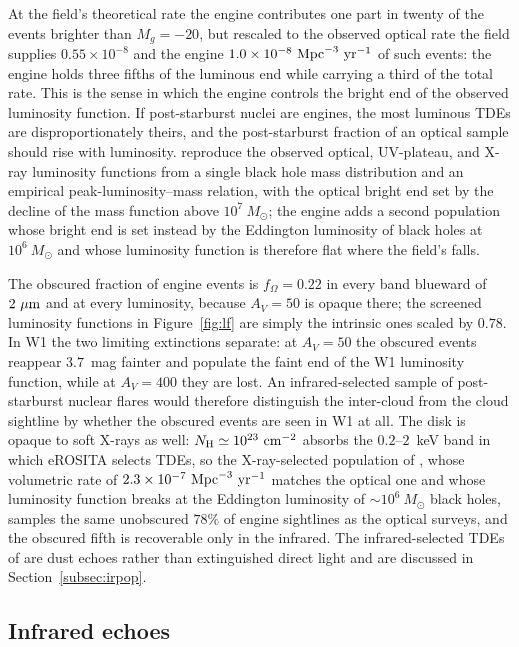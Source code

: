 \documentclass[twocolumn,pdftex]{aastex701}
\newcommand{\msun}{M_{\odot}\xspace}
\newcommand{\fom}{f_{\Omega}\xspace}
\newcommand{\um}{\mu{\rm m}\xspace}
\begin{document}
At the field's theoretical rate the engine contributes one part in twenty of the events brighter than $M_g = -20$, but rescaled to the observed optical rate the field supplies $0.55 \times 10^{-8}$ and the engine $1.0 \times 10^{-8}~{\rm Mpc}^{-3}~{\rm yr}^{-1}$ of such events: the engine holds three fifths of the luminous end while carrying a third of the total rate. This is the sense in which the engine controls the bright end of the observed luminosity function. If post-starburst nuclei are engines, the most luminous TDEs are disproportionately theirs, and the post-starburst fraction of an optical sample should rise with luminosity. \citet{Mummery:2025a} reproduce the observed optical, UV-plateau, and X-ray luminosity functions from a single black hole mass distribution and an empirical peak-luminosity--mass relation, with the optical bright end set by the decline of the mass function above $10^{7}~\msun$; the engine adds a second population whose bright end is set instead by the Eddington luminosity of black holes at $10^{6}~\msun$ and whose luminosity function is therefore flat where the field's falls.

The obscured fraction of engine events is $\fom = 0.22$ in every band blueward of $2~\um$ and at every luminosity, because $A_V = 50$ is opaque there; the screened luminosity functions in Figure~\ref{fig:lf} are simply the intrinsic ones scaled by $0.78$. In W1 the two limiting extinctions separate: at $A_V = 50$ the obscured events reappear $3.7$~mag fainter and populate the faint end of the W1 luminosity function, while at $A_V = 400$ they are lost. An infrared-selected sample of post-starburst nuclear flares would therefore distinguish the inter-cloud from the cloud sightline by whether the obscured events are seen in W1 at all. The disk is opaque to soft X-rays as well: $N_{\rm H} \simeq 10^{23}~{\rm cm}^{-2}$ absorbs the $0.2$--$2$~keV band in which eROSITA selects TDEs, so the X-ray-selected population of \citet{Grotova:2025a}, whose volumetric rate of $2.3 \times 10^{-7}~{\rm Mpc}^{-3}~{\rm yr}^{-1}$ matches the optical one and whose luminosity function breaks at the Eddington luminosity of $\sim 10^{6}~\msun$ black holes, samples the same unobscured $78\%$ of engine sightlines as the optical surveys, and the obscured fifth is recoverable only in the infrared. The infrared-selected TDEs of \citet{Masterson:2024a} are dust echoes rather than extinguished direct light and are discussed in Section~\ref{subsec:irpop}.

\subsection{Infrared echoes}\label{subsec:echo_result}
\end{document}
